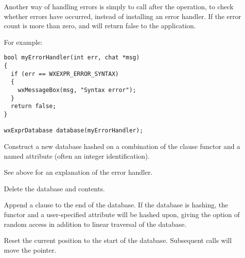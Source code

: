 Another way of handling errors is simply to call  after
the operation, to check whether errors have occurred, instead of installing an error handler.
If the error count is more than zero,  and
\rtfsp{} will return false to
the application.

For example:

\begin{verbatim}
bool myErrorHandler(int err, chat *msg)
{
  if (err == WXEXPR_ERROR_SYNTAX)
  {
    wxMessageBox(msg, "Syntax error");
  }
  return false;
}

wxExprDatabase database(myErrorHandler);
\end{verbatim}


Construct a new database hashed on a combination of the clause functor and
a named attribute (often an integer identification).

See above for an explanation of the error handler.



Delete the database and contents.

\label{wxexprdatabaseappend}


Append a clause to the end of the database. If the database is hashing,
the functor and a user-specified attribute will be hashed upon, giving the
option of random access in addition to linear traversal of the database.

\label{wxexprdatabasebeginfind}


Reset the current position to the start of the database. Subsequent
\rtfsp{} calls will move the pointer.

\label{wxexprdatabasecleardatabase}


